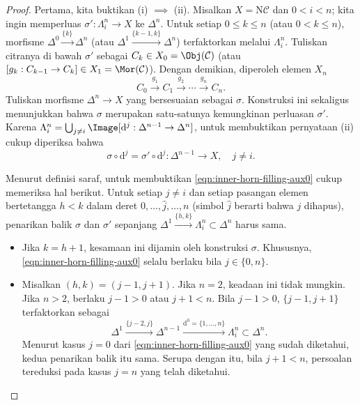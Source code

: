 \begin{proof}
	Pertama, kita buktikan (i) $\implies$ (ii). Misalkan
	$X=\mathrm{N}\mathcal{C}$ dan $0<i<n$; kita ingin memperluas
	$\sigma':\Lambda^n_i\to X$ ke $\Delta^n$. Untuk setiap
	$0\leq k\leq n$ (atau $0<k\leq n$), morfisme
	$\Delta^0\xrightarrow{\{k\}}\Delta^n$ (atau
	$\Delta^1\xrightarrow{\{k-1,k\}}\Delta^n$) terfaktorkan melalui
	$\Lambda^n_i$. Tuliskan citranya di bawah $\sigma'$ sebagai
	$C_k\in X_0=\Obj(\mathcal{C})$ (atau
	$[g_k:C_{k-1}\to C_k]\in X_1=\Mor(\mathcal{C})$). Dengan demikian,
	diperoleh elemen $X_n$
	\[ C_0 \xrightarrow{g_1} C_1 \xrightarrow{g_2} \cdots \xrightarrow{g_n} C_n. \]
	Tuliskan morfisme $\Delta^n\to X$ yang bersesuaian sebagai $\sigma$.
	Konstruksi ini sekaligus menunjukkan bahwa $\sigma$ merupakan satu-satunya
	kemungkinan perluasan $\sigma'$.
	Karena
	$\Lambda^n_i=\bigcup_{j\neq i}\Image[\mathrm{d}^j:
	\Delta^{n-1}\to\Delta^n]$, untuk membuktikan pernyataan (ii) cukup diperiksa bahwa
	\begin{equation}\label{eqn:inner-horn-filling-aux0}
		\sigma \circ \mathrm{d}^j = \sigma' \circ \mathrm{d}^j : \Delta^{n-1} \to X, \quad j \neq i .
	\end{equation}

	Menurut definisi saraf, untuk membuktikan
	\eqref{eqn:inner-horn-filling-aux0} cukup memeriksa hal berikut. Untuk
	setiap $j\neq i$ dan setiap pasangan elemen
	bertetangga $h<k$ dalam deret $0,\ldots,\widehat{j},\ldots,n$ (simbol
	$\widehat{j}$ berarti bahwa $j$ dihapus), penarikan balik $\sigma$ dan
	$\sigma'$ sepanjang
	$\Delta^1\xrightarrow{\{h,k\}}\Lambda^n_i\subset\Delta^n$ harus sama.
	\begin{itemize}
		\item Jika $k=h+1$, kesamaan ini dijamin oleh konstruksi $\sigma$.
		Khususnya, \eqref{eqn:inner-horn-filling-aux0} selalu berlaku bila
		$j\in\{0,n\}$.
		\item Misalkan $(h,k)=(j-1,j+1)$. Jika $n=2$, keadaan ini tidak mungkin.
		Jika $n>2$, berlaku $j-1>0$ atau $j+1<n$. Bila $j-1>0$,
		$\{j-1,j+1\}$ terfaktorkan sebagai
		\[ \Delta^1 \xrightarrow{\{j-2, j\}} \Delta^{n-1} \xrightarrow{\mathrm{d}^0 = \{1, \ldots, n\}} \Lambda^n_i \subset \Delta^n. \]
		Menurut kasus $j=0$ dari
		\eqref{eqn:inner-horn-filling-aux0} yang sudah diketahui, kedua penarikan
		balik itu sama. Serupa dengan itu, bila $j+1<n$, persoalan
		tereduksi pada kasus $j=n$ yang telah diketahui.
	\end{itemize}


\end{proof}
